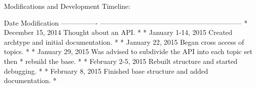 \begin{DoxyParagraph}{Modifications and Development Timeline\-:}
\begin{DoxyVerb}Date              Modification
----------------  --------------------------------------------------------------
* December 15, 2014 Thought about an API.
*
* January 1-14, 2015    Created archtype and initial documentation.
*
* January 22, 2015  Began cross access of topics.
*
* January 29, 2015  Was advised to subdivide the API into each topic set then
*                      rebuild the base.
*
* February 2-5, 2015   Rebuilt structure and started debugging.
*
* February 8, 2015  Finished base structure and added documentation.
*
\end{DoxyVerb}
 
\end{DoxyParagraph}
